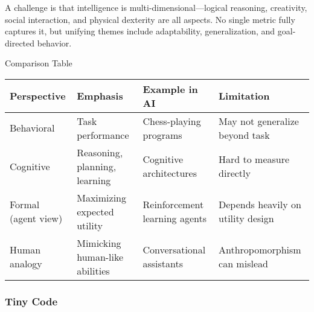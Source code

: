 \documentclass[
  letterpaper,
  DIV=11,
  numbers=noendperiod]{scrreprt}
\begin{document}
A challenge is that intelligence is multi-dimensional---logical
reasoning, creativity, social interaction, and physical dexterity are
all aspects. No single metric fully captures it, but unifying themes
include adaptability, generalization, and goal-directed behavior.

Comparison Table

\begin{longtable}[]{@{}
  >{\raggedright\arraybackslash}p{}
  >{\raggedright\arraybackslash}p{}
  >{\raggedright\arraybackslash}p{}
  >{\raggedright\arraybackslash}p{}@{}}
\toprule\noalign{}
\begin{minipage}[b]{\linewidth}\raggedright
Perspective
\end{minipage} & \begin{minipage}[b]{\linewidth}\raggedright
Emphasis
\end{minipage} & \begin{minipage}[b]{\linewidth}\raggedright
Example in AI
\end{minipage} & \begin{minipage}[b]{\linewidth}\raggedright
Limitation
\end{minipage} \\
\midrule\noalign{}
\endhead
\bottomrule\noalign{}
\endlastfoot
Behavioral & Task performance & Chess-playing programs & May not
generalize beyond task \\
Cognitive & Reasoning, planning, learning & Cognitive architectures &
Hard to measure directly \\
Formal (agent view) & Maximizing expected utility & Reinforcement
learning agents & Depends heavily on utility design \\
Human analogy & Mimicking human-like abilities & Conversational
assistants & Anthropomorphism can mislead \\
\end{longtable}

\subsubsection{Tiny Code}\label{tiny-code}
\end{document}
